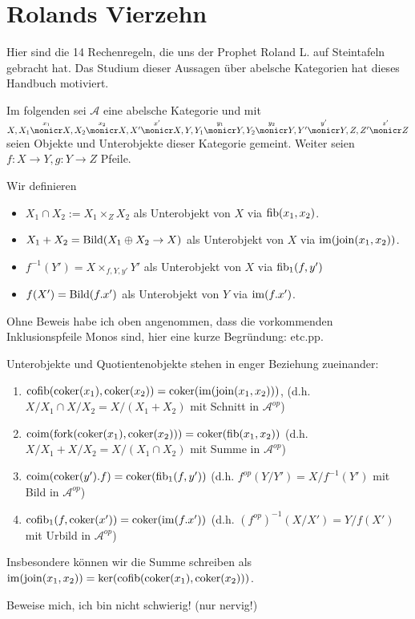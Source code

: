 \section{Rolands Vierzehn}

Hier sind die 14 Rechenregeln, die uns der Prophet Roland L. auf Steintafeln gebracht hat. Das Studium dieser Aussagen über abelsche Kategorien hat dieses Handbuch motiviert.

Im folgenden sei $\mathcal A$ eine abelsche Kategorie und mit $X,
X_1 \overset{x_1}\monicr X,
X_2 \overset{x_2}\monicr X,
X'  \overset{x'}\monicr X,
Y,
Y_1 \overset{y_1}\monicr Y,
Y_2 \overset{y_2}\monicr Y,
Y'  \overset{y'}\monicr Y,
Z,
Z'  \overset{z'}\monicr Z$
seien Objekte und Unterobjekte dieser Kategorie gemeint.
Weiter seien $f:X\to Y, g:Y\to Z$ Pfeile.

\begin{defn}[Objektnotation]
Wir definieren
\begin{itemize}
\item $X_1 \cap X_2 := X_1\times_Z X_2$ als Unterobjekt von $X$ via $\operatorname{fib}(x_1, x_2)$.
\item $X_1+X_2 = \operatorname{Bild}(X_1 \oplus X_2 \to X)$ als Unterobjekt von $X$ via $\operatorname{im}(\operatorname{join}(x_1,x_2))$.
\item $f^{-1}(Y') = X \times_{f,Y,y'} Y'$ als Unterobjekt von $X$ via $\operatorname{fib}_1(f,y')$
\item $f(X') = \operatorname{Bild}(f.x')$ als Unterobjekt von $Y$ via $\operatorname{im}(f.x')$.
\end{itemize}
\end{defn}

\begin{bem}
Ohne Beweis habe ich oben angenommen, dass die vorkommenden Inklusionspfeile Monos sind, hier eine kurze Begründung: etc.pp. %
\end{bem}

\begin{prop}[Reflexionsprinzip]
Unterobjekte und Quotientenobjekte stehen in enger Beziehung zueinander:
\begin{enumerate}
\item $\operatorname{cofib}(\operatorname{coker}(x_1), \operatorname{coker}(x_2)) = \operatorname{coker}(\operatorname{im}(\operatorname{join}(x_1,x_2)))$, (d.h. $X/X_1 \cap X/X_2 = X/(X_1+X_2)$ mit Schnitt in $\mathcal A^{op}$)
\item $\operatorname{coim}(\operatorname{fork}(\operatorname{coker}(x_1),\operatorname{coker}(x_2))) = \operatorname{coker}(\operatorname{fib}(x_1,x_2))$ (d.h. $X/X_1 + X/X_2 = X/(X_1\cap X_2)$ mit Summe in $\mathcal A^{op}$)
\item $\operatorname{coim}(\operatorname{coker}(y').f) = \operatorname{coker}(\operatorname{fib}_1(f,y'))$ (d.h. $f^{op}(Y/Y') = X/f^{-1}(Y')$ mit Bild in $\mathcal A^{op}$)
\item $\operatorname{cofib}_1(f,\operatorname{coker}(x')) = \operatorname{coker}(\operatorname{im}(f.x'))$ (d.h. $(f^{op})^{-1}(X/X') = Y/f(X')$ mit Urbild in $\mathcal A^{op}$)
\end{enumerate}
Insbesondere können wir die Summe schreiben als $\operatorname{im}(\operatorname{join}(x_1,x_2)) = \ker(\operatorname{cofib}(\operatorname{coker}(x_1),\operatorname{coker}(x_2)))$.
\end{prop}
\begin{bew}
Beweise mich, ich bin nicht schwierig! (nur nervig!)
\end{bew}

